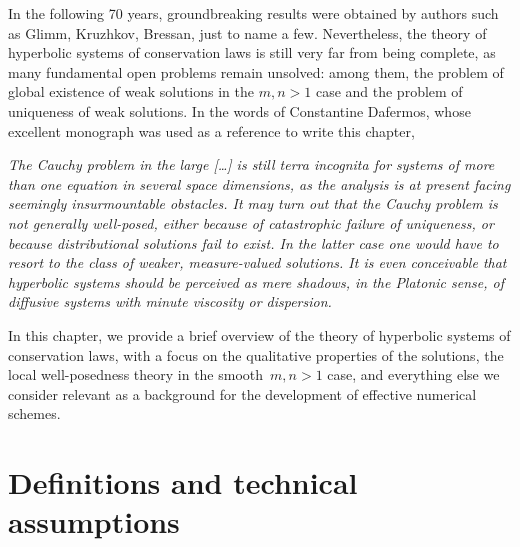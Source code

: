 In the following 70 years, groundbreaking results were obtained
by authors such as Glimm, Kruzhkov, Bressan, just to name a few.
Nevertheless, the theory of hyperbolic systems of conservation laws is still
very far from being complete, as many fundamental open problems remain
unsolved: among them, the problem of global existence of weak
solutions in the $m,n > 1$ case and the problem of uniqueness of weak solutions.
In the words of Constantine Dafermos, whose excellent monograph \cite{dafermos}
was used as a reference to write this chapter,
\begin{quoting}
\textit{The Cauchy problem in the large [\dots]
is still terra incognita for systems of more
than one equation in several space dimensions, as the analysis is at
present facing seemingly insurmountable obstacles. It may turn out that
the Cauchy problem is not generally well-posed, either because of
catastrophic failure of uniqueness, or because distributional solutions
fail to exist. In the latter case one would have to resort to the class
of weaker, measure-valued solutions. It is even conceivable that
hyperbolic systems should be perceived as mere shadows, in the Platonic sense,
of diffusive systems with minute viscosity or dispersion.}
\end{quoting}
In this chapter, we provide a brief overview of the theory of hyperbolic
systems of conservation laws, with a focus on the qualitative properties
of the solutions, the local well-posedness theory in the smooth~$m,n > 1$ case,
and everything else we consider relevant as a background for the development
of effective numerical schemes.

\section{Definitions and technical assumptions}

